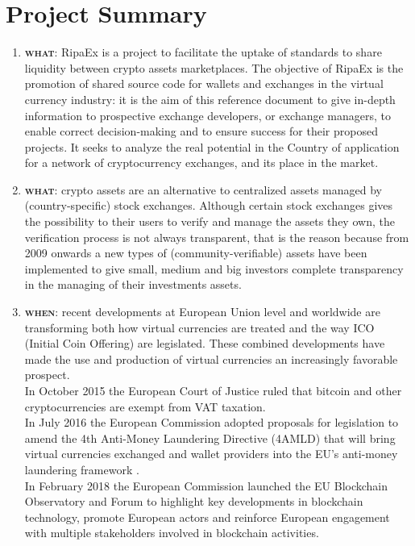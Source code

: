 \documentclass[11pt,fleqn]{book} %
\begin{document}
\section{Project Summary}
\begin{enumerate}
	\item \textbf{\textsc{what}}: RipaEx is a project to facilitate the uptake of standards to share liquidity between crypto assets marketplaces. 
	The objective of RipaEx is the promotion of shared source code for wallets and exchanges in the virtual currency industry: 
	it is the aim of this reference document to give in-depth information to prospective exchange developers,
	or exchange managers, to enable correct decision-making and to ensure success for their proposed projects. 
	It seeks to analyze the real potential in the Country of application for a network of cryptocurrency exchanges, 
	and its place in the market.
	\item \textbf{\textsc{what}}: crypto assets are an alternative to centralized assets managed by (country-specific) stock exchanges. 
	Although certain stock exchanges gives the possibility to their users to verify and manage the assets they own, the verification process
	is not always transparent, that is the reason because from 2009 \cite{bitcoin} onwards a new types of (community-verifiable) assets 
	have been implemented to give small, medium and big investors complete transparency in the managing of their investments
	assets.
	\item \textbf{\textsc{when}}: recent developments at European Union level and worldwide are transforming both how virtual currencies
	are treated and the way ICO (Initial Coin Offering) are legislated. These combined developments 
	have made the use and production of virtual currencies an increasingly favorable prospect. \\
	In October 2015 the European Court of Justice ruled that bitcoin and other cryptocurrencies are exempt from VAT taxation. \\
	In July 2016 the European Commission adopted proposals for legislation to amend the 4th Anti-Money Laundering Directive (4AMLD) that
	will bring virtual currencies exchanged and wallet providers into the EU's anti-money laundering framework \cite{EUAMLCrypto}.\\
	In February 2018 the European Commission launched the EU Blockchain Observatory and Forum \cite{EUBOaF} to highlight key developments 
	in blockchain technology, promote European actors and reinforce European engagement with multiple stakeholders involved in blockchain activities.

\end{enumerate}
\end{document}

